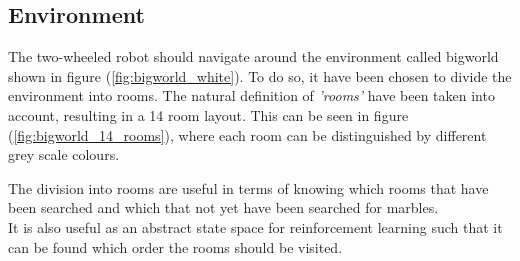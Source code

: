 \documentclass[../Head/Main.tex]{subfiles}
\begin{document}
\subsection{Environment}
\label{subsec:design_environment}
The two-wheeled robot should navigate around the environment called bigworld shown in figure (\ref{fig:bigworld_white}). To do so, it have been chosen to divide the environment into rooms. The natural definition of \textit{'rooms'} have been taken into account, resulting in a 14 room layout. This can be seen in figure (\ref{fig:bigworld_14_rooms}), where each room can be distinguished by different grey scale colours. 

The division into rooms are useful in terms of knowing which rooms that have been searched and which that not yet have been searched for marbles.\\
It is also useful as an abstract state space for reinforcement learning such that it can be found which order the rooms  should be visited.
\end{document}
